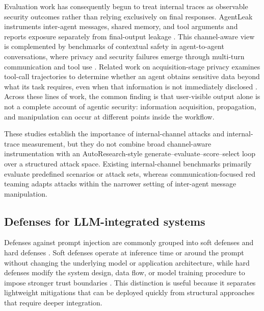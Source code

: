 Evaluation work has consequently begun to treat internal traces as observable
security outcomes rather than relying exclusively on final responses.
AgentLeak instruments inter-agent messages, shared memory, and tool arguments
and reports exposure separately from final-output leakage
\cite{el2026agentleak}. This channel-aware view is complemented by
benchmarks of contextual safety in agent-to-agent conversations, where privacy
and security failures emerge through multi-turn communication and tool use
\cite{gomaa2026converse}. Related work on acquisition-stage privacy examines
tool-call trajectories to determine whether an agent obtains sensitive data
beyond what its task requires, even when that information is not immediately
disclosed \cite{zhang2026privacypeek}. Across these lines of work, the common
finding is that user-visible output alone is not a complete account of agentic
security: information acquisition, propagation, and manipulation can occur at
different points inside the workflow.

These studies establish the importance of internal-channel attacks and
internal-trace measurement, but they do not combine broad channel-aware
instrumentation with an AutoResearch-style generate--evaluate--score--select
loop over a structured attack space. Existing internal-channel benchmarks
primarily evaluate predefined scenarios or attack sets, whereas
communication-focused red teaming adapts attacks within the narrower setting
of inter-agent message manipulation.

\subsection{Defenses for LLM-integrated systems}
Defenses against prompt injection are commonly grouped into soft defenses and
hard defenses \cite{liu2024formalizing,yao2024survey}. Soft defenses operate
at inference time or around the prompt without changing the underlying model or
application architecture, while hard defenses modify the system design, data
flow, or model training procedure to impose stronger trust boundaries
\cite{liu2024formalizing,chen2024struq}. This distinction is useful because it
separates lightweight mitigations that can be deployed quickly from structural
approaches that require deeper integration.

